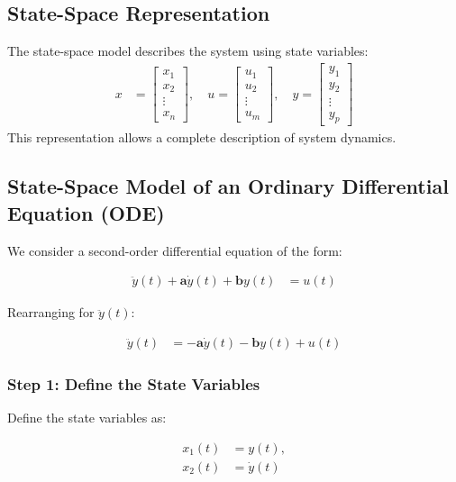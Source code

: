 \documentclass{article}
\begin{document}
\subsection{State-Space Representation}
The state-space model describes the system using state variables:
\begin{align*}
      x & = \begin{bmatrix} x_1 \\ x_2 \\ \vdots \\ x_n \end{bmatrix},
      \quad u = \begin{bmatrix} u_1 \\ u_2 \\ \vdots \\ u_m \end{bmatrix},
      \quad y = \begin{bmatrix} y_1 \\ y_2 \\ \vdots \\ y_p \end{bmatrix}
\end{align*}
This representation allows a complete description of system dynamics.

\subsection{State-Space Model of an Ordinary Differential Equation (ODE)}

We consider a second-order differential equation of the form:

\begin{align*}
      \ddot{y}(t) + \mathbf{a} \dot{y}(t) + \mathbf{b} y(t) &= u(t)
\end{align*}

Rearranging for \( \ddot{y}(t) \):

\begin{align*}
      \ddot{y}(t) &= -\mathbf{a} \dot{y}(t) - \mathbf{b} y(t) + u(t)
\end{align*}

\subsubsection{Step 1: Define the State Variables}

Define the state variables as:

\begin{align*}
      x_1(t) &= y(t), \\
      x_2(t) &= \dot{y}(t)
\end{align*}
\end{document}
